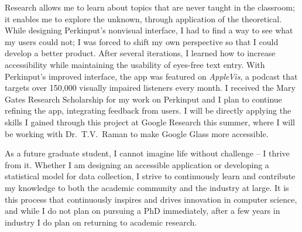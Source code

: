 Research allows me to learn about topics that are never taught in the classroom; it enables me to explore the unknown, through application of the theoretical. While designing Perkinput's nonvisual interface, I had to find a way to see what my users could not; I was forced to shift my own perspective so that I could develop a better product. After several iterations, I learned how to increase accessibility while maintaining the usability of eyes-free text entry. With Perkinput's improved interface, the app was featured on {\it{AppleVis}}, a podcast that targets over 150,000 visually impaired listeners every month. I received the Mary Gates Research Scholarship for my work on Perkinput and I plan to continue refining the app, integrating feedback from users. I will be directly applying the skills I gained through this project at Google Research this summer, where I will be working with Dr.\ T.V.\ Raman to make Google Glass more accessible.\vspace{2 mm}

As a future graduate student, I cannot imagine life without challenge – I thrive from it. Whether I am designing an accessible application or developing a statistical model for data collection, I strive to continuously learn and contribute my knowledge to both the academic community and the industry at large. It is this process that continuously inspires and drives innovation in computer science, and while I do not plan on pursuing a PhD immediately, after a few years in industry I do plan on returning to academic research.

